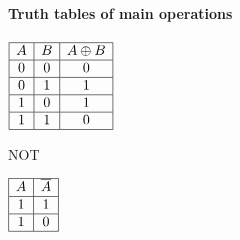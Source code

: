 \documentclass[mathserif]{beamer}
\newenvironment{namedframe}[1]%
	{\begin{frame}\frametitle{\secname}\framesubtitle{#1}}
	{\end{frame}}
\newcommand{\xor}{\oplus}
\newcommand{\negate}[1]{\overline{#1}}
\begin{document}
\begin{namedframe}{Truth tables of main operations}
\begin{center}
\begin{minipage}[t]{0.45\textwidth}
\begin{table}
\begin{math}
						\begin{array}{|c|c|c|}
							\hline
							A & B & A \xor B\\\hline
							0 & 0 & 0\\\hline
							0 & 1 & 1\\\hline
							1 & 0 & 1\\\hline
							1 & 1 & 0\\\hline
						\end{array}
					\end{math}
				\end{table}
				\vspace{\baselineskip}
				\pause
				\begin{table}
					\caption{NOT}
					\begin{math}
						\begin{array}{|c|c|}
							\hline
							A & \negate{A}\\\hline
							1 & 1\\\hline
							1 & 0\\\hline
						\end{array}
					\end{math}
				\end{table}
			\end{minipage}
		\end{center}
	\end{namedframe}
\end{document}

